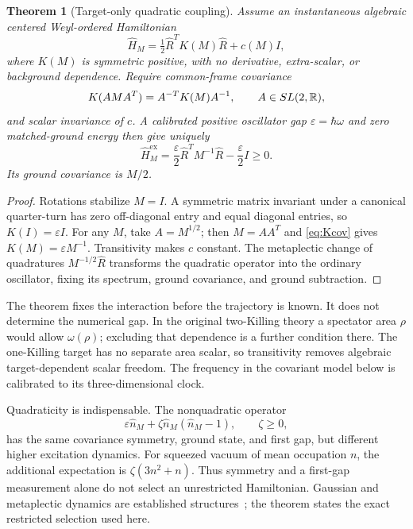 \documentclass[11pt]{article}
\newtheorem{theorem}{Theorem}[section]\newtheorem{proposition}[theorem]{Proposition}
\begin{document}
\begin{theorem}[Target-only quadratic coupling]
Assume an instantaneous algebraic centered Weyl-ordered Hamiltonian
\[
\widehat H_M=\tfrac12\widehat R^TK(M)\widehat R+c(M)I,
\]
where $K(M)$ is symmetric positive, with no derivative, extra-scalar, or background dependence. Require common-frame covariance
\begin{equation}\label{eq:Kcov}
K(AMA^T)=A^{-T}K(M)A^{-1},\qquad A\in SL(2,\mathbb R),
\end{equation}
and scalar invariance of $c$. A calibrated positive oscillator gap $\varepsilon=\hbar\omega$ and zero matched-ground energy then give uniquely
\begin{equation}\label{eq:selectedH}
\boxed{\widehat H_M^{\mathrm{ex}}=
\frac{\varepsilon}{2}\widehat R^TM^{-1}\widehat R-\frac{\varepsilon}{2}I\ge0.}
\end{equation}
Its ground covariance is $M/2$.
\end{theorem}
\begin{proof}
Rotations stabilize $M=I$. A symmetric matrix invariant under a canonical quarter-turn has zero off-diagonal entry and equal diagonal entries, so $K(I)=\varepsilon I$. For any $M$, take $A=M^{1/2}$; then $M=AA^T$ and \eqref{eq:Kcov} gives $K(M)=\varepsilon M^{-1}$. Transitivity makes $c$ constant. The metaplectic change of quadratures $M^{-1/2}\widehat R$ transforms the quadratic operator into the ordinary oscillator, fixing its spectrum, ground covariance, and ground subtraction.
\end{proof}

The theorem fixes the interaction before the trajectory is known. It does not determine the numerical gap. In the original two-Killing theory a spectator area $\rho$ would allow $\omega(\rho)$; excluding that dependence is a further condition there. The one-Killing target has no separate area scalar, so transitivity removes algebraic target-dependent scalar freedom. The frequency in the covariant model below is calibrated to its three-dimensional clock.

Quadraticity is indispensable. The nonquadratic operator
\[
\varepsilon\widehat n_M+\zeta\widehat n_M(\widehat n_M-1),\qquad\zeta\ge0,
\]
has the same covariance symmetry, ground state, and first gap, but different higher excitation dynamics. For squeezed vacuum of mean occupation $n$, the additional expectation is $\zeta(3n^2+n)$. Thus symmetry and a first-gap measurement alone do not select an unrestricted Hamiltonian. Gaussian and metaplectic dynamics are established structures~\cite{HacklBianchi,HacklDynamics}; the theorem states the exact restricted selection used here.
\end{document}
